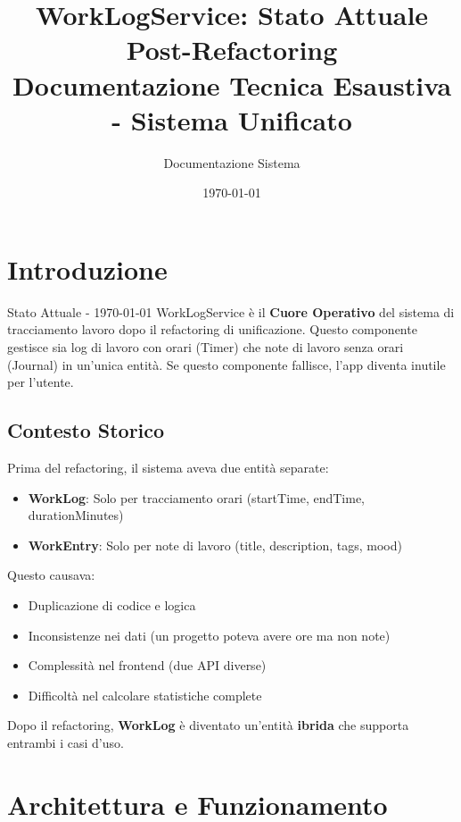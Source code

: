 \documentclass[11pt,a4paper]{article}
\title{\textbf{WorkLogService: Stato Attuale Post-Refactoring}\\
\large Documentazione Tecnica Esaustiva - Sistema Unificato}
\author{Documentazione Sistema}
\date{\today}
\begin{document}
\maketitle
\tableofcontents
\newpage

\section{Introduzione}

\begin{importantbox}{Stato Attuale - \today}
WorkLogService è il \textbf{Cuore Operativo} del sistema di tracciamento lavoro dopo il refactoring di unificazione.
Questo componente gestisce sia log di lavoro con orari (Timer) che note di lavoro senza orari (Journal) in un'unica entità.
Se questo componente fallisce, l'app diventa inutile per l'utente.
\end{importantbox}

\subsection{Contesto Storico}

Prima del refactoring, il sistema aveva due entità separate:
\begin{itemize}
    \item \textbf{WorkLog}: Solo per tracciamento orari (startTime, endTime, durationMinutes)
    \item \textbf{WorkEntry}: Solo per note di lavoro (title, description, tags, mood)
\end{itemize}

Questo causava:
\begin{itemize}
    \item Duplicazione di codice e logica
    \item Inconsistenze nei dati (un progetto poteva avere ore ma non note)
    \item Complessità nel frontend (due API diverse)
    \item Difficoltà nel calcolare statistiche complete
\end{itemize}

Dopo il refactoring, \textbf{WorkLog} è diventato un'entità \textbf{ibrida} che supporta entrambi i casi d'uso.

\section{Architettura e Funzionamento}
\end{document}
